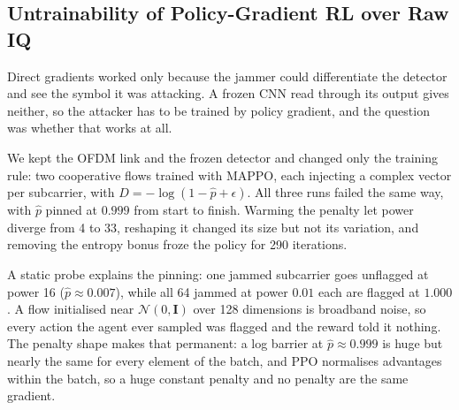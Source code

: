 %
%
%

\subsection{Untrainability of Policy-Gradient RL over Raw IQ}
\label{subsec:exphist:untrainable}
Direct gradients worked only because the jammer could differentiate the detector and see the symbol it
was attacking.
A frozen CNN read through its output gives neither, so the attacker has to be trained by policy
gradient, and the question was whether that works at all.

We kept the OFDM link and the frozen detector and changed only the training rule: two cooperative flows
trained with MAPPO, each injecting a complex vector per subcarrier, with $D = -\log(1-\hat{p}+\epsilon)$.
All three runs failed the same way, with $\hat{p}$ pinned at $0.999$ from start to finish.
Warming the penalty let power diverge from 4 to 33, reshaping it changed its size but not its
variation, and removing the entropy bonus froze the policy for 290 iterations.

A static probe explains the pinning: one jammed subcarrier goes unflagged at power 16
($\hat{p} \approx 0.007$), while all 64 jammed at power $0.01$ each are flagged at $1.000$.
A flow initialised near $\mathcal{N}(0,\mathbf{I})$ over 128 dimensions is broadband noise, so every
action the agent ever sampled was flagged and the reward told it nothing.
The penalty shape makes that permanent: a log barrier at $\hat{p} \approx 0.999$ is huge but nearly the
same for every element of the batch, and PPO normalises advantages within the batch, so a huge constant
penalty and no penalty are the same gradient.

